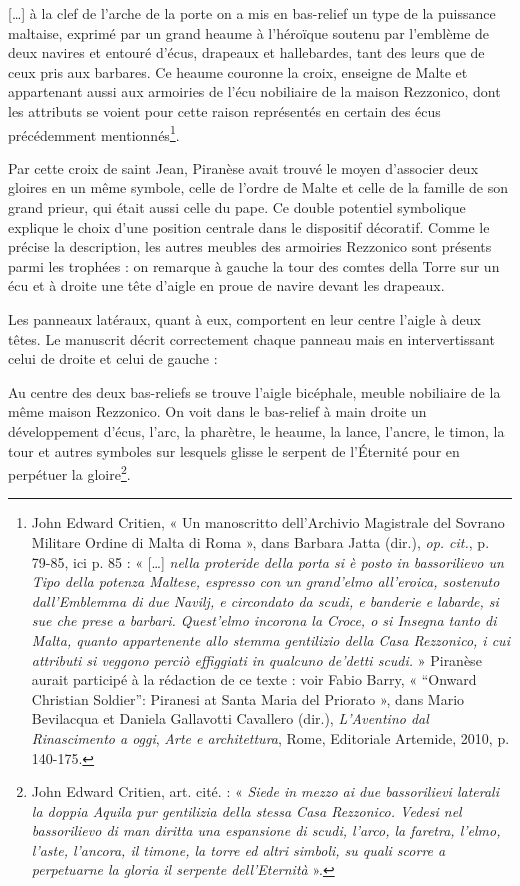 \documentclass[12pt,twoside,openany]{book}
\renewenvironment{quote}
  {%
    \par\begingroup
    \fontsize{11pt}{14pt}\selectfont
    \list{}{\leftmargin=1.5em\rightmargin=1.5em}%
    \item\relax
  }
  {%
    \endlist
    \endgroup
  }
\newenvironment{PurhBlockQuote}
  {%
    \begin{quote}
  }
  {%
    \end{quote}
  }
\begin{document}
\begin{PurhBlockQuote}
[…] à la clef de l’arche de la porte on a mis en bas-relief un type de la puissance maltaise, exprimé par un grand heaume à l’héroïque soutenu par l’emblème de deux navires et entouré d’écus, drapeaux et hallebardes, tant des leurs que de ceux pris aux barbares. Ce heaume couronne la croix, enseigne de Malte et appartenant aussi aux armoiries de l’écu nobiliaire de la maison Rezzonico, dont les attributs se voient pour cette raison représentés en certain des écus précédemment mentionnés\footnote{John Edward Critien, « Un manoscritto dell’Archivio Magistrale del Sovrano Militare Ordine di Malta di Roma », dans Barbara Jatta (dir.), \textit{op. cit.}, p. 79-85, ici p. 85 : « […]\textit{ nella proteride della porta si è posto in bassorilievo un Tipo della potenza Maltese, espresso con un grand’elmo all’eroica, sostenuto dall’Emblemma di due Navilj, e circondato da scudi, e banderie e labarde, si sue che prese a barbari. Quest’elmo incorona la Croce, o si Insegna tanto di Malta, quanto appartenente allo stemma gentilizio della Casa Rezzonico, i cui attributi si veggono perciò effiggiati in qualcuno de’detti scudi. }» Piranèse aurait participé à la rédaction de ce texte : voir Fabio Barry, « “Onward Christian Soldier”: Piranesi at Santa Maria del Priorato », dans Mario Bevilacqua et Daniela Gallavotti Cavallero (dir.), \textit{L’Aventino dal Rinascimento a oggi},\textit{ Arte e architettura}, Rome, Editoriale Artemide, 2010, p. 140-175.}.
\end{PurhBlockQuote}

Par cette croix de saint Jean, Piranèse avait trouvé le moyen d’associer deux gloires en un même symbole, celle de l’ordre de Malte et celle de la famille de son grand prieur, qui était aussi celle du pape. Ce double potentiel symbolique explique le choix d’une position centrale dans le dispositif décoratif. Comme le précise la description, les autres meubles des armoiries Rezzonico sont présents parmi les trophées : on remarque à gauche la tour des comtes della Torre sur un écu et à droite une tête d’aigle en proue de navire devant les drapeaux.

Les panneaux latéraux, quant à eux, comportent en leur centre l’aigle à deux têtes. Le manuscrit décrit correctement chaque panneau mais en intervertissant celui de droite et celui de gauche :

\begin{PurhBlockQuote}
Au centre des deux bas-reliefs se trouve l’aigle bicéphale, meuble nobiliaire de la même maison Rezzonico. On voit dans le bas-relief à main droite un développement d’écus, l’arc, la pharètre, le heaume, la lance, l’ancre, le timon, la tour et autres symboles sur lesquels glisse le serpent de l’Éternité pour en perpétuer la gloire\footnote{John Edward Critien, art. cité. : « \textit{Siede in mezzo ai due bassorilievi laterali la doppia Aquila pur gentilizia della stessa Casa Rezzonico. Vedesi nel bassorilievo di man diritta una espansione di scudi, l’arco, la faretra, l’elmo, l’aste, l’ancora, il timone, la torre ed altri simboli, su quali scorre a perpetuarne la gloria il serpente dell’Eternità} ».}.
\end{PurhBlockQuote}
\end{document}
